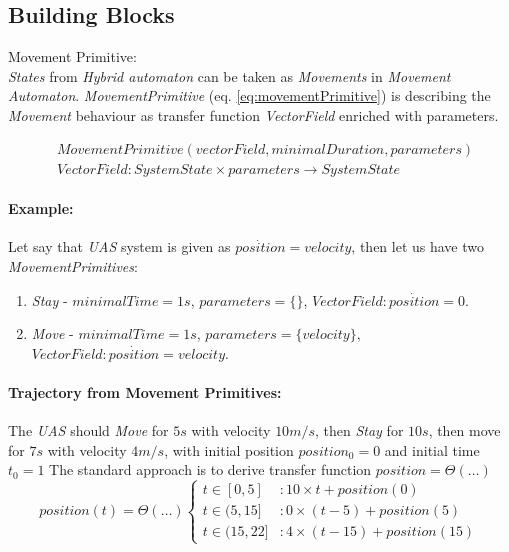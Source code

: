 \subsection{Building Blocks}\label{s:MovementAutomatonBuidlingBlocks}
    \begin{definition}{Movement Primitive:}\label{def:MovementPrimitive}\\\emph{States} from \emph{Hybrid automaton} can be taken as \emph{Movements} in \emph{Movement Automaton}. \emph{MovementPrimitive} (eq. \ref{eq:movementPrimitive}) is describing the \emph{Movement} behaviour as transfer function \emph{VectorField} enriched with parameters. 

    \begin{equation}\label{eq:movementPrimitive}
        \begin{aligned}
            &MovementPrimitive(vectorField,minimalDuration,parameters)\\
            &VectorField:SystemState\times parameters \to SystemState
        \end{aligned}
    \end{equation}
    \end{definition}



    \paragraph{Example: }Let say that \emph{UAS} system is given as $\dot{position}=velocity$, then let us have two \emph{MovementPrimitives}:
    
    \begin{enumerate}
        \item \textit{Stay} - $minimalTime=1s$, $parameters=\{\}$, $VectorField:\dot{position}=0$.
        \item \textit{Move} - $minimalTime=1s$, $parameters=\{velocity\}$, $VectorField:\dot{position}=velocity$.
    \end{enumerate}
    
    \paragraph{Trajectory from Movement Primitives:} The \emph{UAS} should \emph{Move} for $5s$ with velocity $10 m/s$, then \emph{Stay} for $10s$, then move for $7s$ with velocity $4 m/s$, with initial position $position_0=0$ and initial time $t_0=1$ The standard approach is to derive transfer function $position = \Theta(\dots)$
    \begin{equation}\label{eq:trajectoryExample}
        position(t)=\Theta(\dots)
        \begin{cases}
            t \in [0,5] &: 10\times t + position(0)\\
            t \in (5,15] &: 0\times (t-5) + position(5)\\
            t \in (15,22]&: 4\times (t-15) + position(15)
        \end{cases}
    \end{equation}

